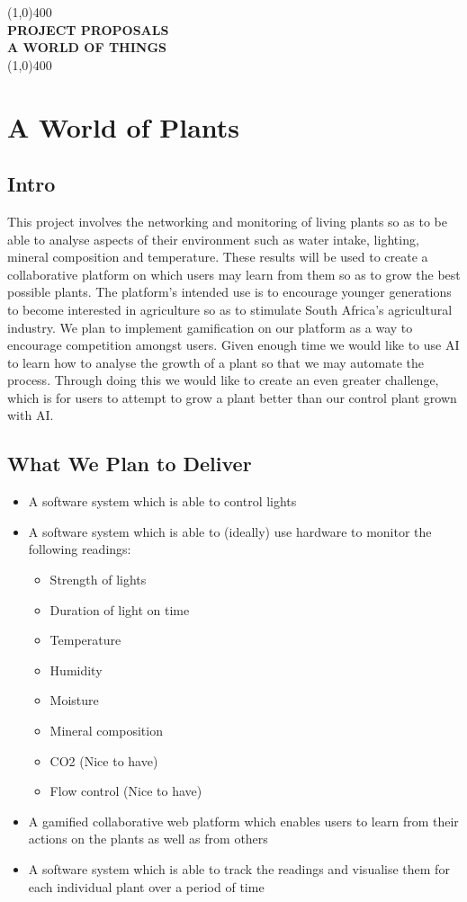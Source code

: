 \documentclass{article}
\begin{document}
\begin{titlepage}
	\begin{center}
		\line(1,0){400}\\
		[6mm]
		\huge{\bfseries PROJECT PROPOSALS\\A WORLD OF THINGS}\\
		\line(1,0){400}\\
	\end{center}
\end{titlepage}

\section{A World of Plants}
	\subsection{Intro}
		This project involves the networking and monitoring of living plants so as to be able to analyse aspects of their environment such as water intake, lighting, mineral composition and temperature. These results will be used to create a collaborative platform on which users may learn from them so as to grow the best possible plants. The platform's intended use is to encourage younger generations to become interested in agriculture so as to stimulate South Africa's agricultural industry. We plan to implement gamification on our platform as a way to encourage competition amongst users. Given enough time we would like to use AI to learn how to analyse the growth of a plant so that we may automate the process. Through doing this we would like to create an even greater challenge, which is for users to attempt to grow a plant better than our control plant grown with AI.
	\subsection{What We Plan to Deliver}
		\begin{itemize}
			\item A software system which is able to control lights
			\item A software system which is able to (ideally) use hardware to monitor the following readings:
				\begin{itemize}
					\item Strength of lights
					\item Duration of light on time
					\item Temperature
					\item Humidity
					\item Moisture
					\item Mineral composition
					\item CO2 (Nice to have)
					\item Flow control (Nice to have)
				\end{itemize}
			\item A gamified collaborative web platform which enables users to learn from their actions on the plants as well as from others
			\item A software system which is able to track the readings and visualise them for each individual plant over a period of time
		\end{itemize}
\end{document}
